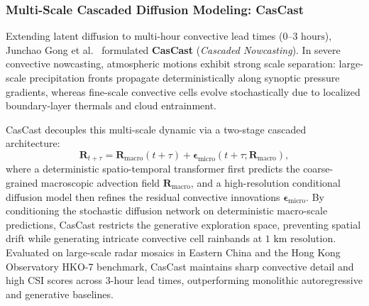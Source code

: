 \subsubsection{Multi-Scale Cascaded Diffusion Modeling: CasCast}
Extending latent diffusion to multi-hour convective lead times ($0\text{--}3\text{ hours}$), Junchao Gong et al.~\cite{gong2024cascast} formulated \textbf{CasCast} (\textit{Cascaded Nowcasting}). In severe convective nowcasting, atmospheric motions exhibit strong scale separation: large-scale precipitation fronts propagate deterministically along synoptic pressure gradients, whereas fine-scale convective cells evolve stochastically due to localized boundary-layer thermals and cloud entrainment.

CasCast decouples this multi-scale dynamic via a two-stage cascaded architecture:
\begin{equation}
    \mathbf{R}_{t+\tau} = \mathbf{R}_{\text{macro}}(t+\tau) + \boldsymbol{\epsilon}_{\text{micro}}(t+\tau; \mathbf{R}_{\text{macro}}),
    \label{eq:cascast_cascade}
\end{equation}
where a deterministic spatio-temporal transformer first predicts the coarse-grained macroscopic advection field $\mathbf{R}_{\text{macro}}$, and a high-resolution conditional diffusion model then refines the residual convective innovations $\boldsymbol{\epsilon}_{\text{micro}}$. By conditioning the stochastic diffusion network on deterministic macro-scale predictions, CasCast restricts the generative exploration space, preventing spatial drift while generating intricate convective cell rainbands at $1\text{ km}$ resolution. Evaluated on large-scale radar mosaics in Eastern China and the Hong Kong Observatory HKO-7 benchmark, CasCast maintains sharp convective detail and high CSI scores across 3-hour lead times, outperforming monolithic autoregressive and generative baselines.



